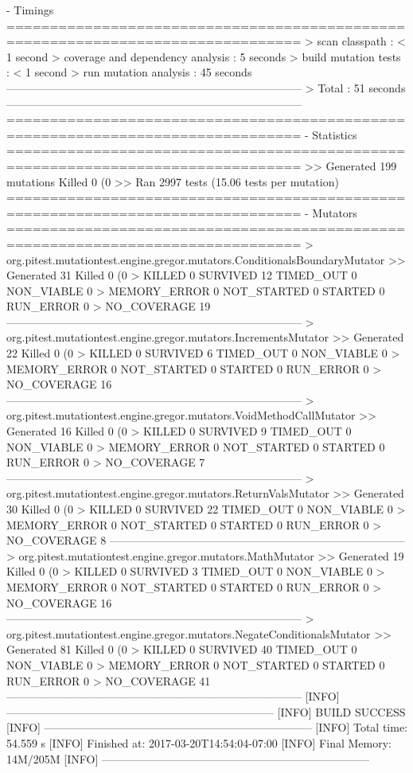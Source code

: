 - Timings
================================================================================
> scan classpath : < 1 second
> coverage and dependency analysis : 5 seconds
> build mutation tests : < 1 second
> run mutation analysis : 45 seconds
--------------------------------------------------------------------------------
> Total  : 51 seconds
--------------------------------------------------------------------------------
================================================================================
- Statistics
================================================================================
>> Generated 199 mutations Killed 0 (0%
>> Ran 2997 tests (15.06 tests per mutation)
================================================================================
- Mutators
================================================================================
> org.pitest.mutationtest.engine.gregor.mutators.ConditionalsBoundaryMutator
>> Generated 31 Killed 0 (0%
> KILLED 0 SURVIVED 12 TIMED_OUT 0 NON_VIABLE 0 
> MEMORY_ERROR 0 NOT_STARTED 0 STARTED 0 RUN_ERROR 0 
> NO_COVERAGE 19 
--------------------------------------------------------------------------------
> org.pitest.mutationtest.engine.gregor.mutators.IncrementsMutator
>> Generated 22 Killed 0 (0%
> KILLED 0 SURVIVED 6 TIMED_OUT 0 NON_VIABLE 0 
> MEMORY_ERROR 0 NOT_STARTED 0 STARTED 0 RUN_ERROR 0 
> NO_COVERAGE 16 
--------------------------------------------------------------------------------
> org.pitest.mutationtest.engine.gregor.mutators.VoidMethodCallMutator
>> Generated 16 Killed 0 (0%
> KILLED 0 SURVIVED 9 TIMED_OUT 0 NON_VIABLE 0 
> MEMORY_ERROR 0 NOT_STARTED 0 STARTED 0 RUN_ERROR 0 
> NO_COVERAGE 7 
--------------------------------------------------------------------------------
> org.pitest.mutationtest.engine.gregor.mutators.ReturnValsMutator
>> Generated 30 Killed 0 (0%
> KILLED 0 SURVIVED 22 TIMED_OUT 0 NON_VIABLE 0 
> MEMORY_ERROR 0 NOT_STARTED 0 STARTED 0 RUN_ERROR 0 
> NO_COVERAGE 8 
--------------------------------------------------------------------------------
> org.pitest.mutationtest.engine.gregor.mutators.MathMutator
>> Generated 19 Killed 0 (0%
> KILLED 0 SURVIVED 3 TIMED_OUT 0 NON_VIABLE 0 
> MEMORY_ERROR 0 NOT_STARTED 0 STARTED 0 RUN_ERROR 0 
> NO_COVERAGE 16 
--------------------------------------------------------------------------------
> org.pitest.mutationtest.engine.gregor.mutators.NegateConditionalsMutator
>> Generated 81 Killed 0 (0%
> KILLED 0 SURVIVED 40 TIMED_OUT 0 NON_VIABLE 0 
> MEMORY_ERROR 0 NOT_STARTED 0 STARTED 0 RUN_ERROR 0 
> NO_COVERAGE 41 
--------------------------------------------------------------------------------
[INFO] ------------------------------------------------------------------------
[INFO] BUILD SUCCESS
[INFO] ------------------------------------------------------------------------
[INFO] Total time: 54.559 s
[INFO] Finished at: 2017-03-20T14:54:04-07:00
[INFO] Final Memory: 14M/205M
[INFO] ------------------------------------------------------------------------
